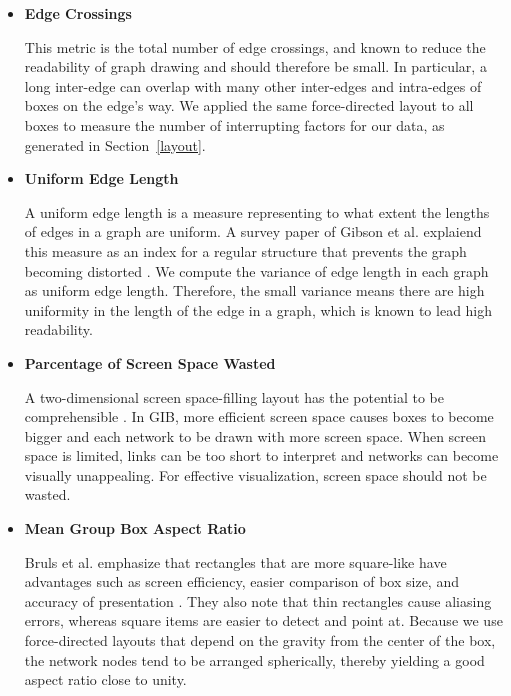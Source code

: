 \documentclass{vgtc}                          %
\begin{document}
\begin{itemize}
\item {\bf Edge Crossings}

This metric is the total number of edge crossings, and known to reduce the readability of graph drawing and should therefore be small.
In particular, a long inter-edge can overlap with many other inter-edges and intra-edges of boxes on the edge's way.
We applied the same force-directed layout to all boxes to measure the number of interrupting factors for our data, as generated in Section~\ref{layout}.

\item {\bf Uniform Edge Length}

A uniform edge length is a measure representing to what extent the lengths of edges in a graph are uniform.
A survey paper of Gibson et al. explaiend this measure as an index for a regular structure that prevents the graph becoming distorted \cite{doi:10.1177/1473871612455749}.
We compute the variance of edge length in each graph as uniform edge length.
Therefore, the small variance means there are high uniformity in the length of the edge in a graph, which is known to lead high readability.

\item {\bf Parcentage of Screen Space Wasted}

A two-dimensional screen space-filling layout has the potential to be comprehensible \cite{shneiderman1992tree}.
In GIB, more efficient screen space causes boxes to become bigger and each network to be drawn with more screen space.
When screen space is limited, links can be too short to interpret and networks can become visually unappealing.
For effective visualization, screen space should not be wasted.

\item {\bf Mean Group Box Aspect Ratio}

Bruls et al. emphasize that rectangles that are more square-like have advantages such as screen efficiency, easier comparison of box size, and accuracy of presentation \cite{bruls2000squarified}.
They also note that thin rectangles cause aliasing errors, whereas square items are easier to detect and point at.
Because we use force-directed layouts that depend on the gravity from the center of the box, the network nodes tend to be arranged spherically, thereby yielding a good aspect ratio close to unity.

\end{itemize}
\end{document}

